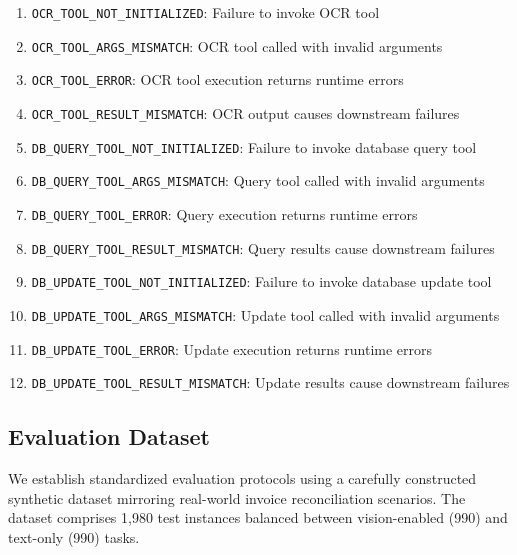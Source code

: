 \documentclass[conference]{IEEEtran}
\begin{document}
\begin{enumerate}
    \item \texttt{OCR\_TOOL\_NOT\_INITIALIZED}: Failure to invoke OCR tool
    \item \texttt{OCR\_TOOL\_ARGS\_MISMATCH}: OCR tool called with invalid arguments
    \item \texttt{OCR\_TOOL\_ERROR}: OCR tool execution returns runtime errors
    \item \texttt{OCR\_TOOL\_RESULT\_MISMATCH}: OCR output causes downstream failures
    \item \texttt{DB\_QUERY\_TOOL\_NOT\_INITIALIZED}: Failure to invoke database query tool
    \item \texttt{DB\_QUERY\_TOOL\_ARGS\_MISMATCH}: Query tool called with invalid arguments
    \item \texttt{DB\_QUERY\_TOOL\_ERROR}: Query execution returns runtime errors
    \item \texttt{DB\_QUERY\_TOOL\_RESULT\_MISMATCH}: Query results cause downstream failures
    \item \texttt{DB\_UPDATE\_TOOL\_NOT\_INITIALIZED}: Failure to invoke database update tool
    \item \texttt{DB\_UPDATE\_TOOL\_ARGS\_MISMATCH}: Update tool called with invalid arguments
    \item \texttt{DB\_UPDATE\_TOOL\_ERROR}: Update execution returns runtime errors
    \item \texttt{DB\_UPDATE\_TOOL\_RESULT\_MISMATCH}: Update results cause downstream failures
\end{enumerate}


\subsection{Evaluation Dataset}

We establish standardized evaluation protocols using a carefully constructed synthetic dataset mirroring real-world invoice reconciliation scenarios. The dataset comprises 1,980 test instances balanced between vision-enabled (990) and text-only (990) tasks.
\end{document}
